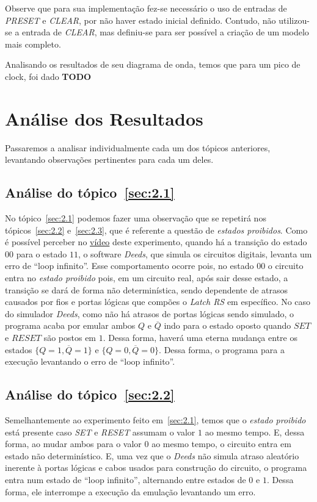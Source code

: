 \documentclass[12pt]{article}
\begin{document}
Observe que para sua implementação fez-se necessário o uso de entradas de \emph{PRESET} e \emph{CLEAR}, por não haver estado inicial definido. Contudo, não utilizou-se a entrada de \emph{CLEAR}, mas definiu-se para ser possível a criação de um modelo mais completo.

Analisando os resultados de seu diagrama de onda, temos que para um pico de clock, foi dado 
\textbf{TODO}

\section{Análise dos Resultados}\label{sec:resultados}

Passaremos a analisar individualmente cada um dos tópicos anteriores, levantando
observações pertinentes para cada um deles.

\subsection{Análise do tópico~\ref{sec:2.1}}\label{sec:analise2.1}

No tópico~\ref{sec:2.1} podemos fazer uma observação que se repetirá nos
tópicos~\ref{sec:2.2} e~\ref{sec:2.3}, que é referente a questão de
\emph{estados proibidos}. Como é possível perceber no
\href{https://youtu.be/RH6w3QnfUhA}{vídeo} deste experimento, quando há a
transição do estado $00$ para o estado $11$, o software \emph{Deeds}, que simula
os circuitos digitais, levanta um erro de ``loop infinito''. Esse comportamento
ocorre pois, no estado $00$ o circuito entra no \emph{estado proibido} pois, em
um circuito real, após sair desse estado, a transição se dará de forma não
determinística, sendo dependente de atrasos causados por fios e portas lógicas
que compões o \emph{Latch RS} em específico. No caso do simulador \emph{Deeds},
como não há atrasos de portas lógicas sendo simulado, o programa acaba por
emular ambos $Q$ e $\overline{Q}$ indo para o estado oposto quando $SET$ e
$RESET$ são postos em $1$. Dessa forma, haverá uma eterna mudança entre os
estados $\{Q = 1, \overline{Q} = 1\}$ e $\{Q = 0, \overline{Q} = 0\}$. Dessa
forma, o programa para a execução levantando o erro de ``loop infinito''.

\subsection{Análise do tópico~\ref{sec:2.2}}\label{sec:analise2.2}

Semelhantemente ao experimento feito em~\ref{sec:2.1}, temos que o \emph{estado
  proibido} está presente caso \emph{SET} e \emph{RESET} assumam o valor $1$ ao
mesmo tempo. E, dessa forma, ao mudar ambos para o valor $0$ ao mesmo tempo, o
circuito entra em estado não determinístico. E, uma vez que o \emph{Deeds} não
simula atraso aleatório inerente à portas lógicas e cabos usados para construção
do circuito, o programa entra num estado de ``loop infinito'', alternando entre
estados de $0$ e $1$. Dessa forma, ele interrompe a execução da emulação
levantando um erro.
\end{document}
